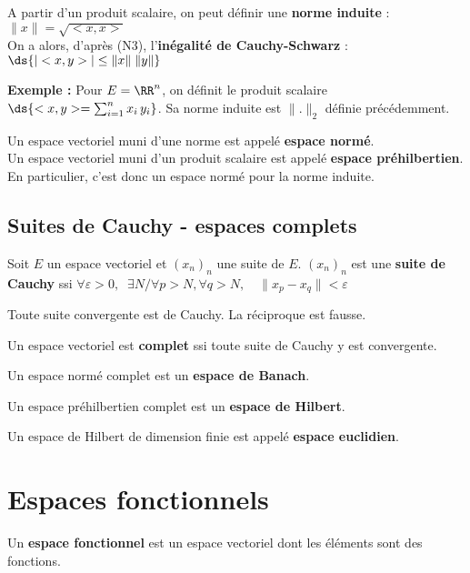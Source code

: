 %
A partir d'un produit scalaire, on peut d\'efinir une {\bf norme induite} : $ \| x \| = \sqrt{<x,x>} $\\
%
On a alors, d'apr\`es (N3), l'{\bf in\'egalit\'e de Cauchy-Schwarz} : $\ds{ | <x,y> | \le \| x \| \; \| y \| }$

%
%
{\bf Exemple :} Pour $E=\RR^n$, on d\'efinit le produit scalaire $\ds{<x,y> = \sum_{i=1}^n x_i \, y_i}$. Sa norme induite est $\| . \|_2$ d\'efinie pr\'ec\'edemment.

%
%
Un espace vectoriel muni d'une norme est appel\'e {\bf espace norm\'e}. \\
Un espace vectoriel muni d'un produit scalaire est appel\'e {\bf espace pr\'ehilbertien}. En particulier, c'est donc un espace norm\'e pour la norme induite.
%
%
\subsection{Suites de Cauchy - espaces complets}
%
%
\noindent
\begin{definition}
  \label{def:1}
  Soit $E$ un espace vectoriel et $(x_n)_n$ une suite de $E$. $(x_n)_n$ est une {\bf suite de Cauchy} ssi $\forall \varepsilon > 0,\;\; \exists N / \forall p>N, \forall q>N, \quad \|x_p - x_q \| < \varepsilon$

\end{definition}

%
Toute suite convergente est de Cauchy. La r\'eciproque est fausse.
%
\begin{definition}
  \label{def:2}
  Un espace vectoriel est {\bf complet} ssi toute suite de Cauchy y est convergente.
\end{definition}


%
\begin{definition}
  \label{def:3}
  Un espace norm\'e complet est un {\bf espace de Banach}.
\end{definition}

%
\begin{definition}
  \label{def:4}
  Un espace pr\'ehilbertien complet est un {\bf espace de Hilbert}.\\
\end{definition}

%
\begin{definition}
  \label{def:5}
  Un espace de Hilbert de dimension finie est appel\'e  {\bf espace euclidien}.
\end{definition}

%
%
%
\section{Espaces fonctionnels}
%
%
\noindent
\begin{definition}
  \label{def:6}
  Un {\bf espace fonctionnel} est un espace vectoriel dont les \'el\'ements
  sont des fonctions.\end{definition}

